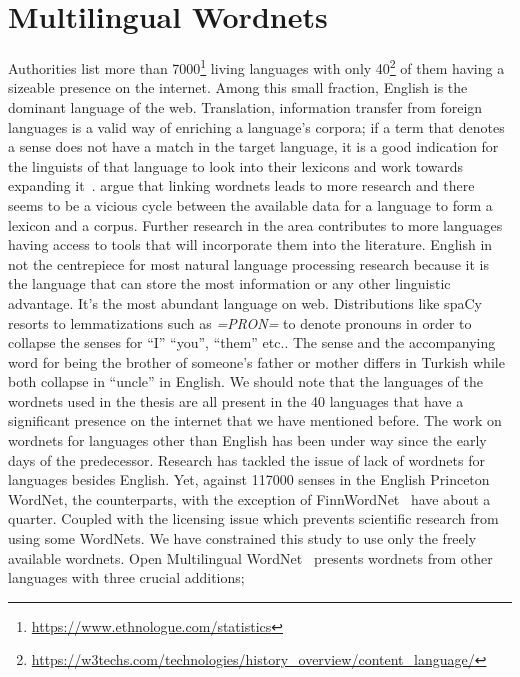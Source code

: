 \section{Multilingual Wordnets}%
\label{sec:multilingual_wordnets}
Authorities list more than 7000\footnote{\url{https://www.ethnologue.com/statistics}} living languages with only 40\footnote{\url{https://w3techs.com/technologies/history_overview/content_language/}} of them having a sizeable presence on the internet.
Among this small fraction, English is the dominant language of the web.
Translation, information transfer from foreign languages is a valid way of enriching a language's corpora;
if a term that denotes a sense does not have a match in the target language, it is a good indication for the linguists of that language to look into their lexicons and work towards expanding it~\cite{ibrahim_usta_turkce_2006}.
\textcite{sagot_building_2008} argue that linking wordnets leads to more research and there seems to be a vicious cycle between the available data for a language to form a lexicon and a corpus.
Further research in the area contributes to more languages having access to tools that will incorporate them into the literature.
English in not the centrepiece for most natural language processing research because it is the language that can store the most information or any other linguistic advantage.
It's the most abundant language on web.
Distributions like spaCy resorts to lemmatizations such as \emph{=PRON=} to denote pronouns in order to collapse the senses for \enquote{I} \enquote{you}, \enquote{them} etc.\@.
The sense and the accompanying word for being the brother of someone's father or mother differs in Turkish while both collapse in \enquote{uncle} in English.
We should note that the languages of the wordnets used in the thesis are all present in the 40 languages that have a significant presence on the internet that we have mentioned before.
The work on wordnets for languages other than English has been under way since the early days of the predecessor.
Research has tackled the issue of lack of wordnets for languages besides English. %
Yet, against 117000 senses in the English Princeton WordNet, the counterparts, with the exception of FinnWordNet~\cite{linden_finnwordnet_2010} have about a quarter.
Coupled with the licensing issue which prevents scientific research from using some WordNets.
We have constrained this study to use only the freely available wordnets.
Open Multilingual WordNet~\cite{bond_survey_2012} presents wordnets from other languages with three crucial additions; %
